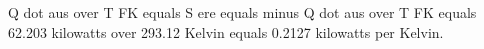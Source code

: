 Q dot aus over T FK equals S ere equals minus Q dot aus over T FK equals 62.203 kilowatts over 293.12 Kelvin equals 0.2127 kilowatts per Kelvin.
